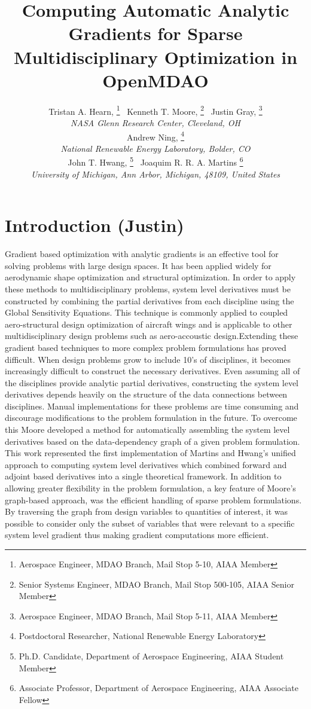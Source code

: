 \documentclass[]{aiaa-tc} %
\title{Computing Automatic Analytic Gradients for Sparse Multidisciplinary Optimization in OpenMDAO}
\author{
  Tristan A. Hearn,%
     \thanks{Aerospace Engineer, MDAO Branch, Mail Stop 5-10, AIAA Member}
  \ Kenneth T. Moore,%
     \thanks{Senior Systems Engineer, MDAO Branch, Mail Stop 500-105, AIAA Senior Member}
  \ Justin Gray,%
     \thanks{Aerospace Engineer, MDAO Branch, Mail Stop 5-11, AIAA Member}
   \\
  {\normalsize\itshape
  NASA Glenn Research Center, Cleveland, OH}  \\
  Andrew Ning,%
  \thanks{Postdoctoral Researcher, National Renewable Energy Laboratory}
  \\
  {\normalsize\itshape
  National Renewable Energy Laboratory, Bolder, CO}  \\
  John T. Hwang,%
  \thanks{Ph.D. Candidate, Department of Aerospace Engineering, AIAA Student Member}
  \ Joaquim R. R. A. Martins%
  \thanks{Associate Professor, Department of Aerospace Engineering, AIAA Associate Fellow}
  \\
  {\normalsize\itshape
   University of Michigan, Ann Arbor, Michigan, 48109, United States}
}
\begin{document}
  \maketitle

  \begin{abstract}

  \end{abstract}

  \section{Introduction (Justin)}

    Gradient based optimization with analytic gradients is an effective tool for solving problems
    with large design spaces. It has been applied widely for aerodynamic shape optimization \cite{Liou2010,palacios2012adjoint}
    and structural optimization\cite{Kennedy:2013:TACS, Venkataraman:2004:SOC, Adelman:1986:structure-sensitivity}.
    In order to apply these methods to multidisciplinary problems, system level derivatives must be
    constructed by combining the partial derivatives from each discipline using the Global Sensitivity
    Equations\cite{Sobieski1990}. This technique is commonly applied to coupled
    aero-structural design optimization of aircraft wings\cite{Kenway2012c, Haghighat2012} and is applicable to
    other multidisciplinary design problems such as aero-accoustic design\cite{economon2012coupled}.Extending these
    gradient based techniques to more complex problem formulations has proved difficult. When
    design problems grow to include 10's of disciplines, it becomes increasingly difficult to construct the
    necessary derivatives. Even assuming all of the disciplines provide analytic partial derivatives,
    constructing the system level derivatives depends heavily on the structure of the data connections
    between disciplines. Manual implementations for these problems are time consuming and discourage modifications
    to the problem formulation in the future. To overcome this Moore developed a method for automatically assembling the system
    level derivatives based on the data-dependency graph of a given problem formulation\cite{openmdao_derivatives}. This
    work represented the first implementation of Martins and Hwang's unified approach to computing system level derivatives
    which combined forward and adjoint based derivatives into a single theoretical framework\cite{Martins2012}. 
    In addition to allowing greater flexibility in the problem formulation, a key feature of Moore's graph-based approach, was the efficient
    handling of sparse problem formulations. By traversing the graph from design variables to quantities of interest,
    it was possible to consider only the subset of variables that were relevant to a specific system level gradient thus
    making gradient computations more efficient.
\end{document}
